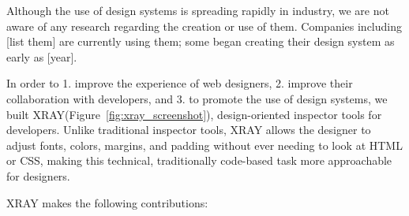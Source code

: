 \documentclass{sigchi}
\newcommand{\xray}{XRAY\xspace}
\begin{document}
Although the use of design systems is spreading rapidly in industry, we are not aware of any research regarding the creation or use of them. Companies including [list them] are currently using them; some began creating their design system as early as [year]. 

In order to 1. improve the experience of web designers, 2. improve their collaboration with developers, and 3. to promote the use of design systems, we built \xray (Figure~\ref{fig:xray_screenshot}), design-oriented inspector tools for developers. Unlike traditional inspector tools, \xray allows the designer to adjust fonts, colors, margins, and padding without ever needing to look at HTML or CSS, making this technical, traditionally code-based task more approachable for designers. 


\xray makes the following contributions: 
\end{document}
